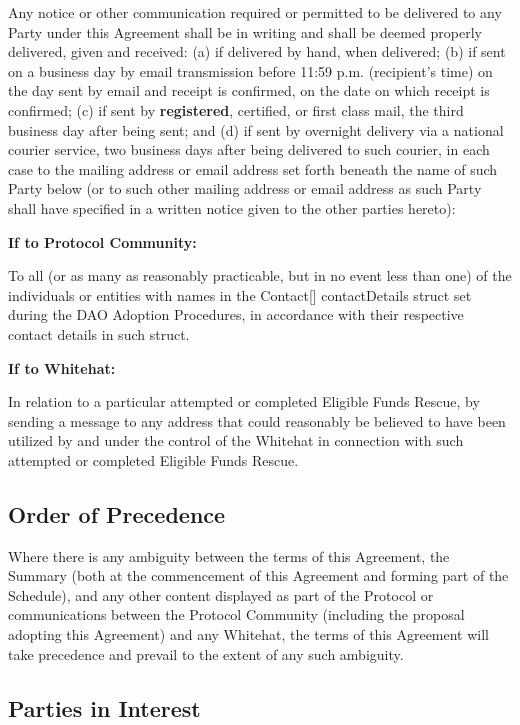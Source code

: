 \documentclass{article}
\begin{document}
Any notice or other communication required or permitted to be delivered to any Party under this Agreement shall be in writing and shall be deemed properly delivered, given and received: (a) if delivered by hand, when delivered; (b) if sent on a business day by email transmission before 11:59 p.m. (recipient's time) on the day sent by email and receipt is confirmed, on the date on which receipt is confirmed; (c) if sent by \textbf{registered}, certified, or first class mail, the third business day after being sent; and (d) if sent by overnight delivery via a national courier service, two business days after being delivered to such courier, in each case to the mailing address or email address set forth beneath the name of such Party below (or to such other mailing address or email address as such Party shall have specified in a written notice given to the other parties hereto):

\textbf{If to Protocol Community:}

To all (or as many as reasonably practicable, but in no event less than one) of the individuals or entities with names in the Contact[] contactDetails struct set during the DAO Adoption Procedures, in accordance with their respective contact details in such struct.

\textbf{If to Whitehat:}

In relation to a particular attempted or completed Eligible Funds Rescue, by sending a message to any address that could reasonably be believed to have been utilized by and under the control of the Whitehat in connection with such attempted or completed Eligible Funds Rescue.

\subsection{Order of Precedence}\label{subsec:order_precedence}

Where there is any ambiguity between the terms of this Agreement, the Summary (both at the commencement of this Agreement and forming part of the Schedule), and any other content displayed as part of the Protocol or communications between the Protocol Community (including the proposal adopting this Agreement) and any Whitehat, the terms of this Agreement will take precedence and prevail to the extent of any such ambiguity.

\subsection{Parties in Interest}\label{subsec:parties_interest}
\end{document}
